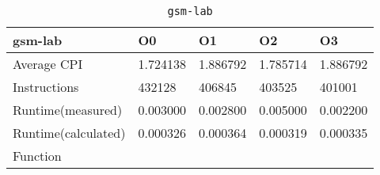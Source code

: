 \begin{table}[ht!]
\centering
\caption{\texttt{gsm-lab}}
\label{tab:gsm-lab}
\begin{tabular}{|l|l|l|l|l|}
\hline
\textbf{gsm-lab}	&	\textbf{O0}	&	\textbf{O1}	&	\textbf{O2}	&	\textbf{O3}	\\\hline\hline
Average CPI	&	1.724138	&	1.886792	&	1.785714	&	1.886792	\\\hline
Instructions	&	432128	&	406845	&	403525	&	401001	\\\hline
Runtime(measured)	&	0.003000	&	0.002800	&	0.005000	&	0.002200	\\\hline
Runtime(calculated)	&	0.000326	&	0.000364	&	0.000319	&	0.000335	\\\hline
Function	&		&		&		&		\\\hline
\end{tabular}
\end{table}
